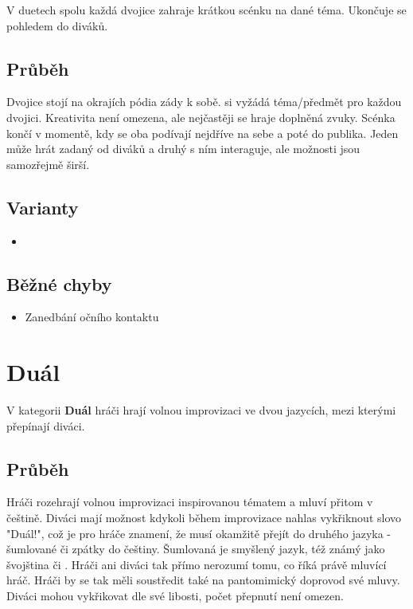 \documentclass[main.tex]{subfiles}
\begin{document}
V duetech spolu každá dvojice zahraje krátkou scénku na dané téma. Ukončuje se pohledem do diváků. 
 
\subsection{ Průběh } Dvojice stojí na okrajích pódia zády k sobě.  si vyžádá téma/předmět pro každou dvojici. Kreativita není omezena, ale nejčastěji se hraje  doplněná zvuky. Scénka končí v momentě, kdy se oba podívají nejdříve na sebe a poté do publika. 
Jeden  může hrát  zadaný od diváků a druhý s ním interaguje, ale možnosti jsou samozřejmě širší. 
 
\subsection{ Varianty } \begin{itemize}
\item {}
\end{itemize}
 
\subsection{ Běžné chyby } \begin{itemize}
\item Zanedbání očního kontaktu
\end{itemize}
 
 
 
 
\needspace{5cm} \section{Duál} \label{duál}  
 
V kategorii \textbf{Duál}{} hráči hrají volnou improvizaci ve dvou jazycích, mezi kterými přepínají diváci. 
 
\subsection{Průběh} Hráči rozehrají volnou improvizaci inspirovanou tématem a mluví přitom v češtině. Diváci mají možnost kdykoli během improvizace nahlas vykřiknout slovo "Duál!", což je pro hráče znamení, že musí okamžitě přejít do druhého jazyka - šumlované či zpátky do češtiny. Šumlovaná je smyšlený jazyk, též známý jako švojština či . Hráči ani diváci tak přímo nerozumí tomu, co říká právě mluvící hráč. Hráči by se tak měli soustředit také na pantomimický doprovod své mluvy. Diváci mohou vykřikovat dle své libosti, počet přepnutí není omezen.  
 
\end{document}
